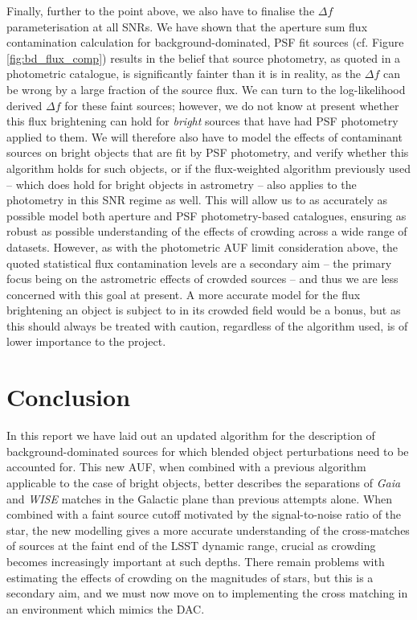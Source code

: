 \documentclass[fleqn,usenatbib]{mnras}
\begin{document}
Finally, further to the point above, we also have to finalise the $\Delta f$ parameterisation at all SNRs. We have shown that the aperture sum flux contamination calculation for background-dominated, PSF fit sources (cf. Figure \ref{fig:bd_flux_comp}) results in the belief that source photometry, as quoted in a photometric catalogue, is significantly fainter than it is in reality, as the $\Delta f$ can be wrong by a large fraction of the source flux. We can turn to the log-likelihood derived $\Delta f$ for these faint sources; however, we do not know at present whether this flux brightening can hold for \textit{bright} sources that have had PSF photometry applied to them. We will therefore also have to model the effects of contaminant sources on bright objects that are fit by PSF photometry, and verify whether this algorithm holds for such objects, or if the flux-weighted algorithm previously used -- which does hold for bright objects in astrometry -- also applies to the photometry in this SNR regime as well. This will allow us to as accurately as possible model both aperture and PSF photometry-based catalogues, ensuring as robust as possible understanding of the effects of crowding across a wide range of datasets. However, as with the photometric AUF limit consideration above, the quoted statistical flux contamination levels are a secondary aim -- the primary focus being on the astrometric effects of crowded sources -- and thus we are less concerned with this goal at present. A more accurate model for the flux brightening an object is subject to in its crowded field would be a bonus, but as this should always be treated with caution, regardless of the algorithm used, is of lower importance to the project.

\section{Conclusion}
In this report we have laid out an updated algorithm for the description of background-dominated sources for which blended object perturbations need to be accounted for. This new AUF, when combined with a previous algorithm applicable to the case of bright objects, better describes the separations of \textit{Gaia} and \textit{WISE} matches in the Galactic plane than previous attempts alone. 
When combined with a faint source cutoff motivated by the signal-to-noise ratio of the star, the new modelling gives a more accurate understanding of the cross-matches of sources at the faint end of the LSST dynamic range, crucial as crowding becomes increasingly important at such depths.
There remain problems with estimating the effects of crowding on the magnitudes of stars, but this is a secondary aim, and we must now move on to implementing the cross matching in an environment which mimics the DAC. 







\bsp	%
\label{lastpage}
\end{document}
